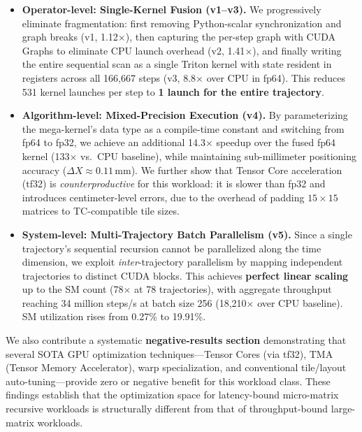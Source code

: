 \documentclass[pdflatex,sn-mathphys-num]{sn-jnl}%
\theoremstyle{thmstyleone}%
\theoremstyle{thmstyletwo}%
\theoremstyle{thmstylethree}%
\begin{document}
\begin{itemize}
\item \textbf{Operator-level: Single-Kernel Fusion (v1--v3).} We progressively eliminate fragmentation: first removing Python-scalar synchronization and graph breaks (v1, 1.12$\times$), then capturing the per-step graph with CUDA Graphs to eliminate CPU launch overhead (v2, 1.41$\times$), and finally writing the entire sequential scan as a single Triton kernel with state resident in registers across all 166,667 steps (v3, 8.8$\times$ over CPU in fp64). This reduces 531 kernel launches per step to \textbf{1 launch for the entire trajectory}.

\item \textbf{Algorithm-level: Mixed-Precision Execution (v4).} By parameterizing the mega-kernel's data type as a compile-time constant and switching from fp64 to fp32, we achieve an additional 14.3$\times$ speedup over the fused fp64 kernel (133$\times$ vs.~CPU baseline), while maintaining sub-millimeter positioning accuracy ($\Delta X \approx 0.11$\,mm). We further show that Tensor Core acceleration (tf32) is \textit{counterproductive} for this workload: it is slower than fp32 and introduces centimeter-level errors, due to the overhead of padding $15\times15$ matrices to TC-compatible tile sizes.

\item \textbf{System-level: Multi-Trajectory Batch Parallelism (v5).} Since a single trajectory's sequential recursion cannot be parallelized along the time dimension, we exploit \textit{inter}-trajectory parallelism by mapping independent trajectories to distinct CUDA blocks. This achieves \textbf{perfect linear scaling} up to the SM count (78$\times$ at 78 trajectories), with aggregate throughput reaching 34 million steps/s at batch size 256 (18,210$\times$ over CPU baseline). SM utilization rises from 0.27\% to 19.91\%.
\end{itemize}

We also contribute a systematic \textbf{negative-results section} demonstrating that several SOTA GPU optimization techniques---Tensor Cores (via tf32), TMA (Tensor Memory Accelerator), warp specialization, and conventional tile/layout auto-tuning---provide zero or negative benefit for this workload class. These findings establish that the optimization space for latency-bound micro-matrix recursive workloads is structurally different from that of throughput-bound large-matrix workloads.

\end{document}
